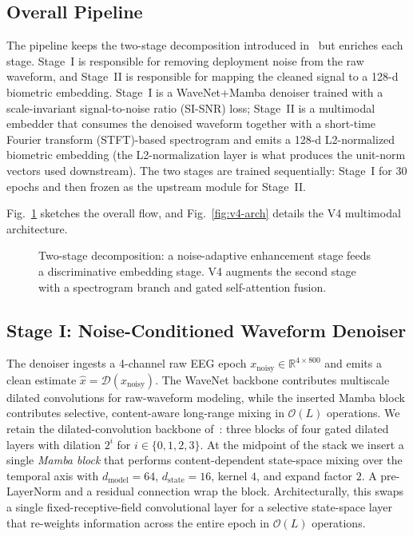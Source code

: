 \documentclass{IEEEtran}
\begin{document}
\subsection{Overall Pipeline}
The pipeline keeps the two-stage decomposition introduced in~\cite{b1} but
enriches each stage. Stage~I is responsible for removing deployment noise
from the raw waveform, and Stage~II is responsible for mapping the cleaned
signal to a 128-d biometric embedding. Stage~I is a WaveNet+Mamba denoiser
trained with a scale-invariant signal-to-noise ratio (SI-SNR) loss;
Stage~II is a multimodal embedder that consumes the denoised waveform
together with a short-time Fourier transform (STFT)-based spectrogram and
emits a 128-d L2-normalized biometric embedding (the L2-normalization
layer is what produces the unit-norm vectors used downstream). The two
stages are trained sequentially: Stage~I for $30$ epochs and then frozen
as the upstream module for Stage~II.

Fig.~\ref{fig:two-stages} sketches the overall flow, and
Fig.~\ref{fig:v4-arch} details the V4 multimodal architecture.

\begin{figure}[t]
\centering
\resizebox{\linewidth}{!}{}
\caption{Two-stage decomposition: a noise-adaptive enhancement stage feeds
a discriminative embedding stage. V4 augments the second stage with a
spectrogram branch and gated self-attention fusion.}
\label{fig:two-stages}
\end{figure}

\subsection{Stage I: Noise-Conditioned Waveform Denoiser}
The denoiser ingests a 4-channel raw EEG epoch
$x_{\mathrm{noisy}}\in\mathbb{R}^{4\times 800}$ and emits a clean estimate
$\hat{x}=\mathcal{D}(x_{\mathrm{noisy}})$. The WaveNet backbone contributes
multiscale dilated convolutions for raw-waveform modeling, while the
inserted Mamba block contributes selective, content-aware long-range mixing
in $\mathcal{O}(L)$ operations. We retain the dilated-convolution backbone
of~\cite{b2,b10}: three blocks of four gated dilated layers with dilation
$2^{i}$ for $i\in\{0,1,2,3\}$. At the midpoint of the stack we insert a
single \emph{Mamba block} that performs content-dependent state-space
mixing over the temporal axis with $d_{\mathrm{model}}=64$,
$d_{\mathrm{state}}=16$, kernel $4$, and expand factor $2$. A
pre-LayerNorm and a residual connection wrap the block. Architecturally,
this swaps a single fixed-receptive-field convolutional layer for a
selective state-space layer that re-weights information across the entire
epoch in $\mathcal{O}(L)$ operations.
\end{document}
